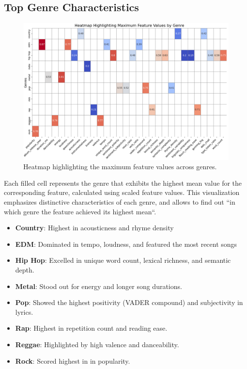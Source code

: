 \subsection{Top Genre Characteristics}
\begin{center}
\begin{figure}[H]
  \centering
  \includegraphics[width=6in]{img/heatmap_max_feature_values_by_genre.png}
  \caption{Heatmap highlighting the maximum feature values across genres.}
  \label{Figure:dendrogram_spotify_features}
\end{figure}
\end{center}
Each filled cell represents the genre that exhibits the highest mean value for
the corresponding feature, calculated using scaled feature values. This
visualization emphasizes distinctive characteristics of each genre, and allows
to find out ``in  which genre the feature achieved its highest mean``.

\begin{itemize}
  \item \textbf{Country}: Highest in acousticness and rhyme density
  \item \textbf{EDM}: Dominated in tempo, loudness, and featured the most
    recent songs
  \item \textbf{Hip Hop}: Excelled in unique word count, lexical richness, and
    semantic depth.
  \item \textbf{Metal}: Stood out for energy and longer song durations.
  \item \textbf{Pop}: Showed the highest positivity (VADER compound) and
    subjectivity in lyrics.
  \item \textbf{Rap}: Highest in repetition count and reading ease.
  \item \textbf{Reggae}: Highlighted by high valence and danceability.
  \item \textbf{Rock}: Scored highest in in popularity.
    
\end{itemize}

